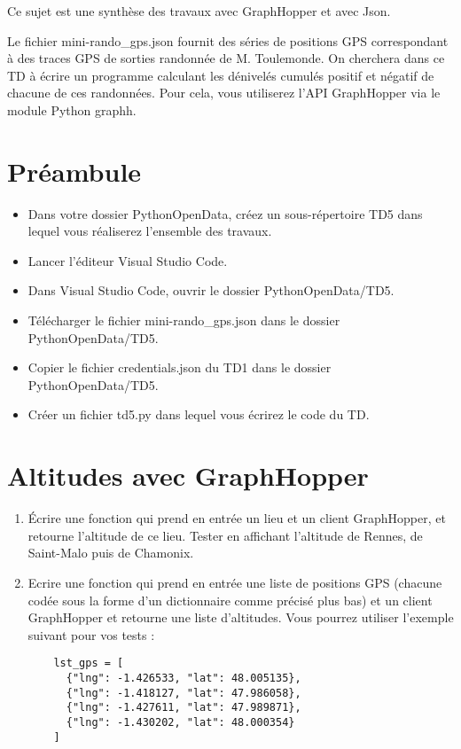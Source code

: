 \documentclass[11pt,a4paper]{article}
\begin{document}
Ce sujet est une synthèse des travaux avec GraphHopper et avec Json. 

Le fichier mini-rando\_gps.json fournit des séries de positions GPS correspondant à des traces GPS de sorties randonnée de M. Toulemonde. On cherchera dans ce TD à écrire un programme calculant les dénivelés cumulés positif et négatif de chacune de ces randonnées. Pour cela, vous utiliserez l’API GraphHopper via le module Python graphh.

\section*{Préambule}
\begin{itemize}
    \item Dans votre dossier PythonOpenData, créez un sous-répertoire TD5 dans lequel vous réaliserez l'ensemble des travaux.
    \item Lancer l'éditeur Visual Studio Code.
    \item Dans Visual Studio Code, ouvrir le dossier PythonOpenData/TD5. 
    \item Télécharger le fichier mini-rando\_gps.json dans le dossier PythonOpenData/TD5.
  \item Copier le fichier credentials.json du TD1 dans le dossier PythonOpenData/TD5.
  \item Créer un fichier td5.py dans lequel vous écrirez le code du TD. 
\end{itemize}

\section{Altitudes avec GraphHopper}
\begin{enumerate}
    \item Écrire une fonction qui prend en entrée un lieu et un client GraphHopper, et retourne l'altitude de ce lieu.  Tester en affichant l'altitude de Rennes, de Saint-Malo puis de Chamonix.
    \item Ecrire une fonction qui prend en entrée une liste de positions GPS (chacune codée sous la forme d’un dictionnaire comme précisé plus bas) et un client GraphHopper et retourne une liste d’altitudes. Vous pourrez utiliser l’exemple suivant pour vos tests :
\begin{verbatim}
    lst_gps = [
      {"lng": -1.426533, "lat": 48.005135},
      {"lng": -1.418127, "lat": 47.986058},
      {"lng": -1.427611, "lat": 47.989871},
      {"lng": -1.430202, "lat": 48.000354}
    ]
\end{verbatim}
\end{enumerate}
\end{document}
